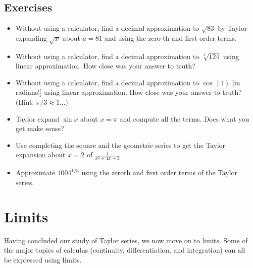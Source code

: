 \documentclass[twoside,openright,titlepage,a4paper]{book}
\begin{document}
\begin{sloppypar}
\subsection{Exercises}
\begin{itemize}
\item Without using a calculator, find a decimal approximation to $\sqrt{83}$ by Taylor-expanding $\sqrt{x}$ about $a=81$ and using the zero-th and first order terms.
\item Without using a calculator, find a decimal approximation to $\sqrt[3]{124}$ using linear approximation. How close was your answer to truth?	
\item Without using a calculator, find a decimal approximation to $\cos(1)$ [in radians!] using linear approximation. How close was your answer to truth? (Hint: $\pi/3\approx 1$...)
\item Taylor expand $\sin x$ about $x=\pi$ and compute all the terms. Does what you get make sense?
\item Use completing the square and the geometric series to get the Taylor expansion about $x=2$ of $\frac{1}{x^2+4x+3}$
\item Approximate $1004^{1/3}$ using the zeroth and first order terms of the Taylor series.
\end{itemize}

\section{Limits} \label{ChFunctionsSecLimits}

Having concluded our study of Taylor series, we now move on to limits. Some of the major topics of calculus (continuity, differentiation, and integration) can all be expressed using limits.


\end{sloppypar}
\end{document}

